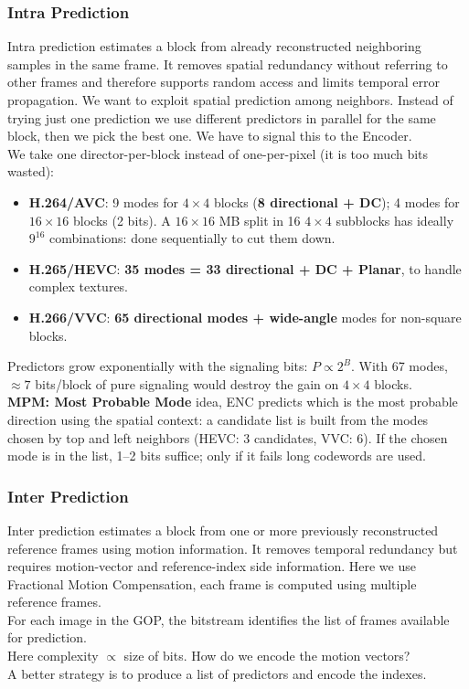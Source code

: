 \subsubsection{Intra Prediction}
Intra prediction estimates a block from already reconstructed neighboring samples in the same frame. It removes spatial redundancy without referring to other frames and therefore supports random access and limits temporal error propagation.
We want to exploit spatial prediction among neighbors.
Instead of trying just one prediction we use different predictors in parallel for the same block, then we pick the best one. We have to signal this to the Encoder.\\
We take one director-per-block instead of one-per-pixel (it is too much bits wasted):
\begin{itemize}
    \item \textbf{H.264/AVC}: 9 modes for $4\times4$ blocks (\textbf{8 directional + DC}); 4 modes for $16\times16$ blocks (2 bits). A $16\times16$ MB split in 16 $4\times4$ subblocks has ideally $9^{16}$ combinations: done sequentially to cut them down.
    \item \textbf{H.265/HEVC}: \textbf{35 modes = 33 directional + DC + Planar}, to handle complex textures.
    \item \textbf{H.266/VVC}: \textbf{65 directional modes + wide-angle} modes for non-square blocks.
\end{itemize}
Predictors grow exponentially with the signaling bits: $P \propto 2^B$. With 67 modes, $\approx 7$ bits/block of pure signaling would destroy the gain on $4\times4$ blocks.\\
\textbf{MPM: Most Probable Mode} idea, ENC predicts which is the most probable direction using the spatial context: a candidate list is built from the modes chosen by top and left neighbors (HEVC: 3 candidates, VVC: 6). If the chosen mode is in the list, 1--2 bits suffice; only if it fails long codewords are used.
\subsubsection{Inter Prediction}
Inter prediction estimates a block from one or more previously reconstructed reference frames using motion information. It removes temporal redundancy but requires motion-vector and reference-index side information.
Here we use Fractional Motion Compensation, each frame is computed using multiple reference frames.\\
For each image in the GOP, the bitstream identifies the list of frames available for prediction.\\
 Here complexity $\propto$ size of bits. How do we encode the motion vectors?\\
A better strategy is to produce a list of predictors and encode the indexes.
